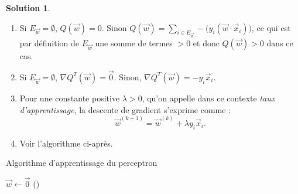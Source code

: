 \documentclass[a4paper,francais]{article}
\theoremstyle{definition}
\newtheorem*{solution}{Solution}
\begin{document}
\begin{solution}
  \begin{enumerate}
  \item Si $E_{\vec{w}} = \emptyset$, $Q(\vec{w}) = 0$.
    Sinon $Q(\vec{w}) = \sum_{i \in E_{\vec{w}}} - \big( y_i (\vec{w}\cdot\vec{x}_i) \big)$,
    ce qui est par définition de $E_{\vec{w}}$ une somme de termes $> 0$ et donc
    $Q(\vec{w}) > 0$ dans ce cas. 
  \item Si $E_{\vec{w}} = \emptyset$, ${\nabla Q}^T(\vec{w}) = \vec{0}$. Sinon,
    ${\nabla Q}^T(\vec{w}) = -y_i \vec{x}_i$.
  \item Pour une constante positive $\lambda > 0$, qu'on appelle dans ce
    contexte \emph{taux d'apprentissage}, la descente de gradient s'exprime
    comme :
    \[ \vec{w}^{(k+1)} = \vec{w}^{(k)} + \lambda y_i \vec{x}_i. \]
  \item Voir l'algorithme ci-après. 
  \end{enumerate}
    \begin{algorithm}[htbp]
    \caption{Algorithme d'apprentissage du perceptron}
    $\vec{w} \leftarrow \vec{0}$ \;
    ()
     \;
  \end{algorithm}
\end{solution}
\end{document}
